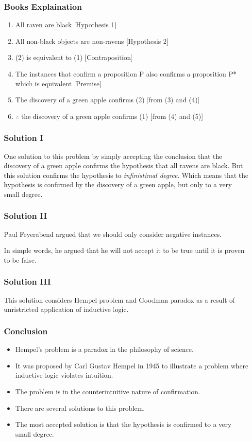 \documentclass[
    10pt,
    aspectratio=169,
    xcolor={dvipsnames},
]{beamer}
\begin{document}
\begin{frame}
    \frametitle{Books Explaination}
    \begin{enumerate}[(1)]
        \item All raven are black [Hypothesis 1]
        \item All non-black objects are non-ravens [Hypothesis 2]
        \item (2) is equivalent to (1) [Contraposition]
        \item The instances that confirm a proposition P also confirms a proposition P* which is equivalent [Premise]
        \item The discovery of a green apple confirms (2) [from (3) and (4)]
        \item \(\therefore\) the discovery of a green apple confirms (1) [from (4) and (5)]
    \end{enumerate}
\end{frame}

\begin{frame}
    \frametitle{Solution I}
    One solution to this problem by simply accepting the conclusion that the discovery of a green apple confirms the hypothesis that all ravens are black.
    \vfill
    But this solution confirms the hypothesis to \textit{infinistimal degree.}
    \vfill
    Which means that the hypothesis is confirmed by the discovery of a green apple, but only to a very small degree.
\end{frame}

\begin{frame}
    \frametitle{Solution II}
    Paul Feyerabend argued that we should only consider negative instances.

    \vfill

    In simple words, he argued that he will not accept it to be true until it is proven to be false.
\end{frame}

\begin{frame}
    \frametitle{Solution III}
    This solution considers Hempel problem and Goodman paradox as a result of unristricted application of inductive logic.
\end{frame}

\begin{frame}
    \frametitle{Conclusion}
    \begin{itemize}
        \item Hempel's problem is a paradox in the philosophy of science.
        \item It was proposed by Carl Gustav Hempel in 1945 to illustrate a problem where inductive logic violates intuition.
        \item The problem is in the counterintuitive nature of confirmation.
        \item There are several solutions to this problem.
        \item The most accepted solution is that the hypothesis is confirmed to a very small degree.
    \end{itemize}
\end{frame}
\end{document}
